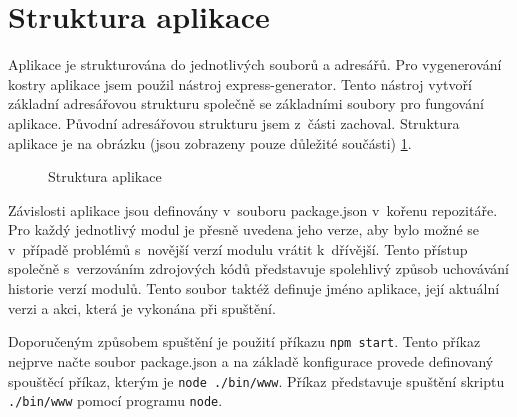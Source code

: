 \documentclass[thesis=M,czech]{FITthesis}[2012/06/26]
\begin{document}
  \section{Struktura aplikace}

    Aplikace je strukturována do jednotlivých souborů a adresářů.
    Pro vygenerování kostry aplikace jsem použil nástroj express-generator.
    Tento nástroj vytvoří základní adresářovou strukturu společně se
    základními soubory pro fungování aplikace.
    Původní adresářovou strukturu jsem z~části zachoval.
    Struktura aplikace je na obrázku (jsou zobrazeny pouze důležité součásti) \ref{fig:app_structure}.
    
    \begin{figure}[h]
      \caption[Struktura aplikace]{Struktura aplikace}
      \label{fig:app_structure}
    \end{figure}

    Závislosti aplikace jsou definovány v~souboru package.json v~kořenu repozitáře.
    Pro každý jednotlivý modul je přesně uvedena jeho verze,
    aby bylo možné se v~případě problémů s~novější verzí modulu vrátit k~dřívější.
    Tento přístup společně s~verzováním zdrojových kódů
    představuje spolehlivý způsob uchovávání historie verzí modulů.
    Tento soubor taktéž definuje jméno aplikace,
    její aktuální verzi a akci, která je vykonána při spuštění.
 
    Doporučeným způsobem spuštění je použití příkazu \verb|npm start|.
    Tento příkaz nejprve načte soubor package.json a na základě
    konfigurace provede definovaný spouštěcí příkaz,
    kterým je \verb|node ./bin/www|.
    Příkaz představuje spuštění skriptu \verb|./bin/www| pomocí programu \verb|node|.
\end{document}
